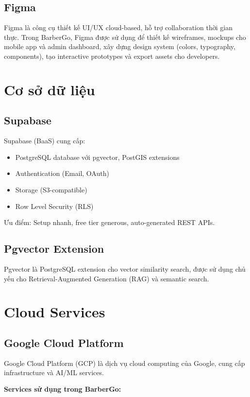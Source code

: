\subsection{Figma}
Figma là công cụ thiết kế UI/UX cloud-based, hỗ trợ collaboration thời gian thực. Trong BarberGo, Figma được sử dụng để thiết kế wireframes, mockups cho mobile app và admin dashboard, xây dựng design system (colors, typography, components), tạo interactive prototypes và export assets cho developers.


\section{Cơ sở dữ liệu}
\subsection{Supabase}

Supabase (BaaS) cung cấp:
\begin{itemize}
    \item PostgreSQL database với pgvector, PostGIS extensions
    \item Authentication (Email, OAuth)
    \item Storage (S3-compatible)
    \item Row Level Security (RLS)
\end{itemize}

Ưu điểm: Setup nhanh, free tier generous, auto-generated REST APIs.

\subsection{Pgvector Extension}

Pgvector là PostgreSQL extension cho vector similarity search, được sử dụng chủ yếu cho Retrieval-Augmented Generation (RAG) và semantic search.


\section{Cloud Services}

\subsection{Google Cloud Platform}

Google Cloud Platform (GCP) là dịch vụ cloud computing của Google, cung cấp infrastructure và AI/ML services.

\textbf{Services sử dụng trong BarberGo:}

